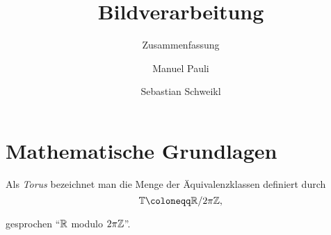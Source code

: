 



\title{Bildverarbeitung}
\subtitle{Zusammenfassung}
\author{Manuel Pauli\and{}Sebastian Schweikl}

\maketitle

\section{Mathematische Grundlagen}

\begin{definition}[Torus]
Als \emph{Torus} bezeichnet man die Menge der Äquivalenzklassen definiert durch
\[
  \T \coloneqq \R / 2\pi\Z,
\]

gesprochen \enquote{$ \mathbb{R} $ modulo $ 2\pi\mathbb{Z} $}.
\end{definition}

